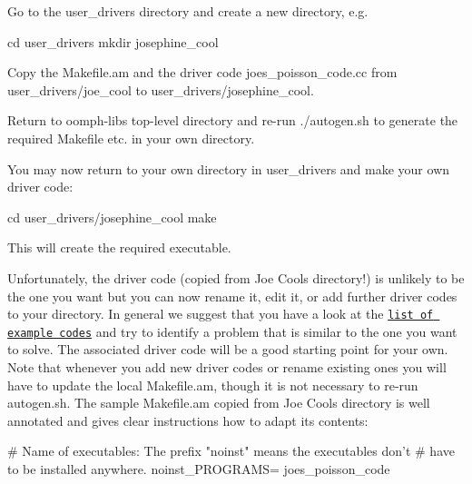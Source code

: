 \begin{DoxyEnumerate}
\item Go to the {\ttfamily user\+\_\+drivers} directory and create a new directory, e.\+g. 
\begin{DoxyCode}
cd user\_drivers
mkdir josephine\_cool
\end{DoxyCode}

\item Copy the {\ttfamily Makefile.\+am} and the driver code {\ttfamily joes\+\_\+poisson\+\_\+code.\+cc} from {\ttfamily user\+\_\+drivers/joe\+\_\+cool} to {\ttfamily user\+\_\+drivers/josephine\+\_\+cool}.
\item Return to {\ttfamily oomph-\/lib\textquotesingle{}s} top-\/level directory and re-\/run {\ttfamily ./autogen.sh} to generate the required Makefile etc. in your own directory.
\item You may now return to your own directory in {\ttfamily user\+\_\+drivers} and make your own driver code\+: 
\begin{DoxyCode}
cd user\_drivers/josephine\_cool
make
\end{DoxyCode}
 This will create the required executable. ~\newline
~\newline

\item Unfortunately, the driver code (copied from Joe Cool\textquotesingle{}s directory!) is unlikely to be the one you want but you can now rename it, edit it, or add further driver codes to your directory. In general we suggest that you have a look at the \href{../../example_code_list/html/index.html}{\tt list of example codes} and try to identify a problem that is similar to the one you want to solve. The associated driver code will be a good starting point for your own. Note that whenever you add new driver codes or rename existing ones you will have to update the local {\ttfamily Makefile}.{\ttfamily am}, though it is not necessary to re-\/run {\ttfamily autogen}.{\ttfamily sh}. The sample {\ttfamily Makefile}.{\ttfamily am} copied from Joe Cool\textquotesingle{}s directory is well annotated and gives clear instructions how to adapt its contents\+: ~\newline
~\newline

\begin{DoxyCodeInclude}
# Name of executables: The prefix "noinst" means the executables don't
# have to be installed anywhere.
noinst\_PROGRAMS= joes\_poisson\_code


\end{DoxyCodeInclude}
\end{DoxyEnumerate}
